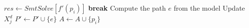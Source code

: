 	\STATE $res \gets SmtSolve\left[
	 f'(p_i) 
	\right]$
		\STATE \textbf{break}
	\ENDIF
	\STATE Compute the path $e$ from the model
	\STATE Update $X^d_j$
	\STATE $P' \gets P' \cup \{e\}$
	\STATE $A \gets A \cup \{p_i\}$
\ENDWHILE
